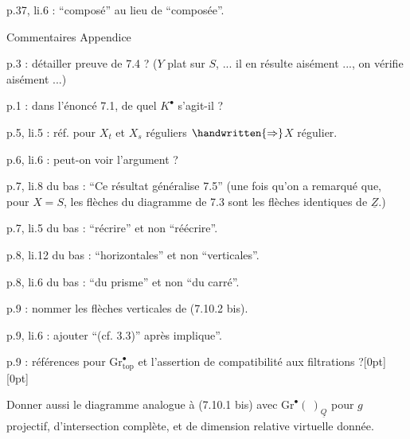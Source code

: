 p.37, li.6 : ``composé'' au lieu de ``composée''.

\begin{center}
Commentaires Appendice
\end{center}

p.3 : détailler preuve de 7.4 ? ($Y$ plat sur $S$, ... il en résulte aisément ..., on vérifie aisément ...)

p.1 : dans l'énoncé 7.1, de quel $K^{\bullet}$ s'agit-il ?

p.5, li.5 : réf. pour $X_t$ et $X_s$ réguliers $\handwritten{\Rightarrow}$$X$ régulier.

p.6, li.6 : peut-on voir l'argument ?

p.7, li.8 du bas : ``Ce résultat généralise 7.5'' (une fois qu'on a remarqué que, pour $X = S$, les flèches du diagramme de 7.3 sont les flèches identiques de $\underline{Z}$.)

p.7, li.5 du bas : ``récrire'' et non ``réécrire''.

p.8, li.12 du bas : ``horizontales'' et non ``verticales''.

p.8, li.6 du bas : ``du prisme'' et non ``du carré''.

p.9 : nommer les flèches verticales de (7.10.2 bis).

p.9, li.6 : ajouter ``(cf. 3.3)'' après implique''.

p.9 : références pour $\mathrm{Gr}^{\bullet}_{\mathrm{top}}$ et l'assertion de compatibilité aux filtrations ?\hspace{0.4em}\raisebox{0.35ex}[0pt][0pt]{\parbox[c]{2mm}{}}

Donner aussi le diagramme analogue à (7.10.1 bis) avec $\mathrm{Gr}^{\bullet}(\ )_{\underline{Q}}$ pour $g$ projectif, d'intersection complète, et de dimension relative virtuelle donnée.

